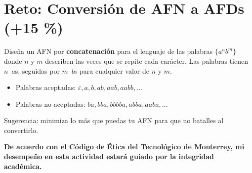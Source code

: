 \documentclass[8pt, onside]{article}
\begin{document}
\section*{Reto: Conversión de AFN a AFDs (+15 \%)}

Diseña un AFN por \textbf{concatenación} para el lenguaje de las palabras $\{a^n b^m\}$ donde $n$ y $m$ describen las veces que se repite cada carácter.
Las palabras tienen $n \,$ $a$s, seguidas por $m \,$ $b$s para cualquier valor de $n$ y $m$.

\begin{itemize}
    \item Palabras aceptadas: $\varepsilon, a, b, ab, aab, aabb, \dots$
    \item Palabras no aceptadas: $ba, bba, bbbba, abba, aaba, \dots$
\end{itemize}

Sugerencia: minimiza lo más que puedas tu AFN para que no batalles al convertirlo.

\vfill

\textbf{De acuerdo con el Código de Ética del Tecnológico de Monterrey, mi desempeño en esta actividad estará guiado por la integridad académica.}
\end{document}
